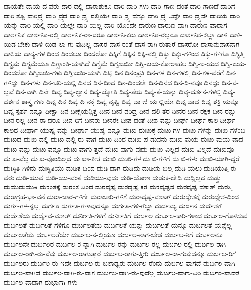 {ದಾಯತೇ
ದಾಯ-ದ-ವರು
ದಾರ-ದಲ್ಲಿ
ದಾರಾಶುಕೂ
ದಾರಿ
ದಾರಿ-ಗಳು
ದಾರಿ-ಗಾಣ-ದಂತೆ
ದಾರಿ-ಗಾಣದೆ
ದಾರಿಗೆ
ದಾರಿ-ತಪ್ಪಿ
ದಾರಿದ್ರ್ಯ
ದಾರಿ-ದ್ರ್ಯದ
ದಾರಿ-ದ್ರ್ಯ-ದಲ್ಲಿಯೇ
ದಾರಿ-ದ್ರ್ಯ-ವನ್ನೂ
ದಾರಿ-ದ್ರ್ಯ-ವಿದ್ದೇ
ದಾರಿ-ದ್ರ್ಯವೇ
ದಾರಿಯ
ದಾರಿ-ಯನ್ನು
ದಾರಿ-ಯಲ್ಲಿ
ದಾರಿ-ಯಲ್ಲೇ
ದಾರಿ-ಯಿಲ್ಲ
ದಾರಿ-ಯೊಂದೇ
ದಾರುಣ
ದಾರುಣ-ವಾಗಿ
ದಾರುಣ-ವಾದಾಗ
ದಾರ್ಶನಿಕ
ದಾರ್ಶನಿಕ-ರಲ್ಲಿ
ದಾರ್ಶನಿಕ-ರಾ-ದರೂ
ದಾರ್ಶನಿ-ಕರು
ದಾರ್ಶನಿಕ-ರೆಲ್ಲರೂ
ದಾರ್ಶನಿಕ-ರೆಲ್ಲಾ
ದಾಳಿ
ದಾಳಿ-ಯಿಡ-ಬೇಕು
ದಾಳಿ-ಯಿಡ-ಲಾ-ಗು-ವುದಿಲ್ಲ
ದಾಸರ
ದಾಸ-ರಂತೆ
ದಾಸ-ರಾಗಿ-ರುತ್ತಾರೆ
ದಾಸರೋ
ದಾಸಾನುದಾಸನಾಗ
ದಾಸಿಯ
ದಾಸ್ಯ-ಗಳ
ದಿಂದ
ದಿಂದಲೂ
ದಿಂದಲೋ
ದಿಕ್ಕಿಗೆ
ದಿಕ್ಕಿನ
ದಿಕ್ಕಿ-ನಲ್ಲಿ
ದಿಕ್ಕು
ದಿಕ್ಕು-ಗಳಿಂದ
ದಿಕ್ಕು-ಗಳಿಗೂ
ದಿಗ್ಭಿತ್ತಿ
ದಿಗ್ಭ್ರಮೆ
ದಿಗ್ಭ್ರಮೆಯೂ
ದಿಗ್ಭ್ರಾಂತಿ-ಯಾಗಿದೆ
ದಿಗ್ಭ್ರೆಮೆ
ದಿಗ್ವಜಯೀ
ದಿಗ್ವಿ-ಜಯ-ಕೋಲಾಹಲ
ದಿಗ್ವಿ-ಜ-ಯದ
ದಿಗ್ವಿ-ಜಯ-ದಿಂದಲೋ
ದಿಗ್ವಿಜಯಿ-ಗಳು
ದಿಗ್ವಿಜಯಿ-ಯಾಗಿ
ದಿಟ್ಟಿ
ದಿನ
ದಿನಂಪ್ರತಿ
ದಿನ-ಗಳ
ದಿನ-ಗಳಲ್ಲಿ
ದಿನ-ಗಳ-ವರೆಗೆ
ದಿನ-ಗಳಿದ್ದು
ದಿನ-ಗಳು
ದಿನ-ಚರಿ-ಯಲ್ಲಿ
ದಿನದ
ದಿನ-ದಿಂದ
ದಿನ-ದಿಂದಲೇ
ದಿನ-ದಿನದ
ದಿನ-ದಿ-ನವೂ
ದಿನದ್ದು
ದಿನ-ವ-ಲ್ಲವೆ
ದಿನ-ವಾಗಿ
ದಿನೇ
ದಿವ್ಯ
ದಿವ್ಯ-ಜ್ಞಾನ
ದಿವ್ಯ-ಜ್ಯೋತಿ
ದಿವ್ಯ-ತೆಯ
ದಿವ್ಯ-ತೆ-ಯನ್ನು
ದಿವ್ಯ-ದರ್ಶನ-ಗಳಲ್ಲಿ
ದಿವ್ಯ-ದರ್ಶನ-ಶಾಸ್ತ್ರ-ಗಳು
ದಿವ್ಯ-ದಿನ
ದಿವ್ಯ-ದಿ-ನಕ್ಕೆ
ದಿವ್ಯ-ದೃಷ್ಟಿ
ದಿವ್ಯ-ವಾ-ಣಿ-ಯ-ಲ್ಲಿಯೇ
ದಿವ್ಯ-ವಾದ
ದಿವ್ಯ-ಶಕ್ತಿ-ಯನ್ನೂ
ದಿವ್ಯ-ಸ್ಪರ್ಶ-ವನ್ನೂ
ದೀಕ್ಷಾ-ದಿನ
ದೀಕ್ಷೆಯನ್ನಿತ್ತ
ದೀನ
ದೀನ-ದರಿದ್ರ
ದೀನ-ದಲಿ-ತರ
ದೀನರ
ದೀನ-ರಕ್ಷಕ
ದೀನ-ರನ್ನು
ದೀನ-ರಲ್ಲಿ
ದೀನ-ರಾ-ದರೂ
ದೀನ-ರಿಗೆ
ದೀನರು
ದೀನರೇ
ದೀಪ-ದಂತೆ
ದೀಪ-ವನ್ನು
ದೀರ್ಘ
ದೀರ್ಘ-ಕಾಲ
ದೀರ್ಘ-ಕಾಲದ
ದೀರ್ಘಾ-ಯುಷ್ಯ-ವನ್ನು
ದೀರ್ಘಾ-ಯುಷ್ಯ-ವನ್ನೂ
ದುಃಖ
ದುಃಖಕ್ಕೆ
ದುಃಖ-ಗಳ
ದುಃಖ-ಗಳನ್ನು
ದುಃಖ-ಗಳೆಂಬ
ದುಃಖದ
ದುಃಖ-ದಲ್ಲಿ
ದುಃಖ-ದಲ್ಲಿ-ರು-ವಾಗ
ದುಃಖ-ದಿಂದ
ದುಃಖ-ಪ-ಡುವನು
ದುಃಖ-ಮಯ
ದುಃಖ-ಮಯ-ವಾದ
ದುಃಖ-ವನ್ನು
ದುಃಖ-ವನ್ನೂ
ದುಃಖ-ವಾಗು-ತ್ತದೆ
ದುಃಖ-ವಾಗು-ವುದು
ದುಃಖ-ವಿಲ್ಲದ
ದುಃಖ-ವಿಲ್ಲದೆ
ದುಃಖವೂ
ದುಃಖ-ವೆಲ್ಲ
ದುಃಖ-ವೊಂದಿಲ್ಲದ
ದುಃಖಾ-ತೀತ
ದುಃಖಿ
ದುಃಖಿ-ಗಳ
ದುಃಖಿ-ಗಳಿಗೆ
ದುಃಖಿ-ಗಳು
ದುಃಖಿ-ಯಾಗಿ-ದ್ದರೆ
ದುಃಸ್ಥಿತಿ-ಗಿಳಿದು
ದುಃಸ್ಥಿತಿಯು
ದುಡಿತ-ದಿಂದ
ದುಡಿ-ದಾಗ
ದುಡಿದು
ದುಡಿಯ-ಬಲ್ಲ
ದುಡಿ-ಯಲು
ದುಡಿಯುತ್ತಿ-ರು-ವರು
ದುಡಿ-ಯುವ
ದುಡಿ-ಯು-ವಂತೆ
ದುಡಿಯು-ವುದು
ದುಡಿ-ಯೋಣ
ದುಡುಕ-ಬೇಡಿ
ದುಡ್ಡಿಲ್ಲದ
ದುಡ್ಡು
ದುಮುದುಮುಕಿ
ದುರಂತಕ್ಕೆ
ದುರಂತ-ದಿಂದ
ದುರದೃಷ್ಟ
ದುರದೃಷ್ಟ-ಕರ
ದುರದೃಷ್ಟದ
ದುರದೃಷ್ಟ-ವಶಾತ್
ದುರಸ್ತಿ
ದುರಾಗ್ರಹ-ಭಾ-ವನೆ
ದುರಾ-ಚಾರ-ಗಳಿಗೇ
ದುರಾಚಾರಿ-ಗಳಿಗೆ
ದುರಾದೃಷ್ಟ-ವಶಾತ್
ದುರುದ್ದೇಶಕ್ಕೆ
ದುರುದ್ದೇಶ-ದಿಂದ
ದುರ್ಗ-ಗಳ-ನ್ನೆಲ್ಲ
ದುರ್ಗತಿ
ದುರ್ಗತಿ-ಗಳಾವುದನ್ನೂ
ದುರ್ಗತಿ-ಗಳಿ-ಗೆಲ್ಲಾ
ದುರ್ದಮ್ಯ
ದುರ್ದಿನ
ದುರ್ದೆಶೆಗೆ
ದುರ್ದೆಶೆಯ
ದುರ್ದೈವ-ವಶಾತ್
ದುರ್ನೀತಿ-ಗಳಿಗೆ
ದುರ್ನೀತಿಗೆ
ದುರ್ಬಲ
ದುರ್ಬಲ-ಕಾರಿ-ಗಳಾದ
ದುರ್ಬಲ-ಗೊಳಿಸುವ
ದುರ್ಬಲತೆ
ದುರ್ಬಲತೆ-ಗಳಿಗೂ
ದುರ್ಬಲತೆಯ
ದುರ್ಬಲತೆ-ಯನ್ನು
ದುರ್ಬಲತೆ-ಯನ್ನೂ
ದುರ್ಬಲತೆ-ಯನ್ನೆಲ್ಲ
ದುರ್ಬಲತೆಯೆ
ದುರ್ಬಲತೆಯೇ
ದುರ್ಬಲ-ನ-ಲ್ಲಿಯೂ
ದುರ್ಬಲ-ನಾಗ-ಬೇಡ
ದುರ್ಬಲ-ನಿಗೆ
ದುರ್ಬಲನೂ
ದುರ್ಬಲನೇ
ದುರ್ಬಲರ
ದುರ್ಬಲ-ರ-ನ್ನಾಗಿ
ದುರ್ಬಲ-ರನ್ನು
ದುರ್ಬಲ-ರಲ್ಲ
ದುರ್ಬಲ-ರಲ್ಲಿ
ದುರ್ಬಲ-ರಾಗಿ
ದುರ್ಬಲ-ರಾಗಿ-ರು-ವೆವು
ದುರ್ಬಲ-ರಾಗುತ್ತಾರೆ
ದುರ್ಬಲ-ರಾಗು-ತ್ತೀರಿ
ದುರ್ಬಲ-ರಾ-ಗುವುದನ್ನೂ
ದುರ್ಬಲ-ರಿಗೆ
ದುರ್ಬಲರು
ದುರ್ಬಲ-ರು-ಇದೇ
ದುರ್ಬಲ-ರು-ಬಲಾಢ್ಯರು
ದುರ್ಬಲ-ರೆಂದು
ದುರ್ಬಲ-ವಾಗದೆ
ದುರ್ಬಲ-ವಾಗಿ
ದುರ್ಬಲ-ವಾಗಿದೆ
ದುರ್ಬಲ-ವಾಗಿ-ರು-ವಾಗ
ದುರ್ಬಲ-ವಾಗಿ-ರು-ವುದೆಲ್ಲ
ದುರ್ಬಲ-ವಾಗು-ವಿರಿ
ದುರ್ಬಲ-ವಾದರೆ
ದುರ್ಬಲ-ವಾದಾಗ
ದುರ್ಭಾಗಿ-ಗಳು
}
